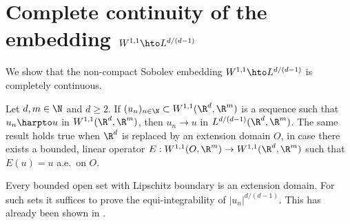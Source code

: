 \section{Complete continuity of the embedding \texorpdfstring{$W^{1,1}\hto L^{d/(d-1)}$}{}}\label{app:1}
We show that the non-compact Sobolev embedding $W^{1,1}\hto L^{d/(d-1)}$ is completely continuous.
\begin{theorem}\label{thm.embedding}
Let $d,m\in\N$ and $d\geq 2$. If $(u_n)_{n\in\N}\subset W^{1,1}(\R^d,\R^m)$ is a sequence such that $u_n\harpto u$ in $W^{1,1}(\R^d,\R^m)$, then $u_n\to u$ in $L^{d/(d-1)}(\R^d,\R^m)$. The same result holds true when $\R^d$ is replaced by an extension domain $O$, \ie in case there exists a bounded, linear operator $E:W^{1,1}(O,\R^m)\to W^{1,1}(\R^d,\R^m)$ such that $E(u)=u$ a.e.\ on $O$.
\end{theorem}
\begin{remark}
Every bounded open set with Lipschitz boundary is an extension domain. For such sets it suffices to prove the equi-integrability of $|u_n|^{d/(d-1)}$. This has already been shown in \cite[Lem.\,A.3]{DLFS}.
\end{remark}
